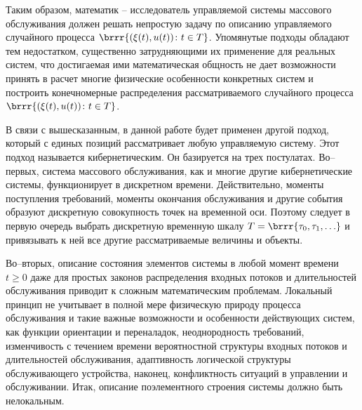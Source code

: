 Таким образом, математик -- исследователь управляемой системы массового обслуживания должен решать непростую задачу по описанию управляемого случайного процесса $\brrr{(\xi(t), u(t)) \colon t \in T}$. Упомянутые подходы обладают тем недостатком, существенно затрудняющими их применение для реальных систем, что достигаемая ими математическая общность не дает возможности принять в расчет многие физические особенности конкретных систем и построить конечномерные распределения рассматриваемого случайного процесса $\brrr{(\xi(t), u(t)) \colon t \in T}$.

В связи с вышесказанным, в данной работе будет применен другой подход, который с единых позиций рассматривает любую управляемую систему. Этот подход называется кибернетическим. Он базируется на трех постулатах. Во--первых, система массового обслуживания, как и многие другие кибернетические системы, функционирует в дискретном времени. Действительно, моменты поступления требований, моменты окончания обслуживания и другие события образуют дискретную совокупность точек на временной оси. Поэтому следует в первую очередь выбрать дискретную временную шкалу $T=\brrr{\tau_0, \tau_1, \ldots}$ и привязывать к ней все другие рассматриваемые величины и объекты. 

Во--вторых, описание состояния элементов системы в любой момент времени $t \geqslant 0$ даже для простых законов распределения входных потоков и длительностей обслуживания приводит к сложным математическим проблемам. Локальный принцип не учитывает в полной мере физическую природу процесса обслуживания и такие важные возможности и особенности действующих систем, как функции ориентации и переналадок, неоднородность требований, изменчивость с течением времени вероятностной структуры входных потоков и длительностей обслуживания, адаптивность логической структуры обслуживающего устройства, наконец, конфликтность ситуаций в управлении и обслуживании. Итак, описание поэлементного строения системы должно быть нелокальным.

